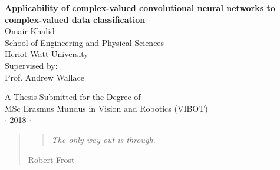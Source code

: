 
\newpage
\thispagestyle{empty}

\vspace*{2cm}
\begin{center}
{\Large\bf Applicability of complex-valued convolutional neural networks to complex-valued data classification\\} \vspace{2cm} {\large
Omair Khalid\\
\vspace{2cm}
School of Engineering and Physical Sciences \\
Heriot-Watt University\\
\vspace{2cm}
Supervised by: \\
\centering Prof. Andrew Wallace
}

\end{center}

\vspace{5cm}
\begin{center}
{\large A Thesis Submitted for the Degree of \\MSc Erasmus Mundus
in Vision and Robotics (VIBOT) \\\vspace{0.3cm} $\cdot$ 2018
$\cdot$}
\end{center}
\singlespacing


\begin{abstract}
The abstract is very abstract as of now.

\vspace*{5cm}

\end{abstract}

\begin{quote}
\vspace*{\fill}
\begin{center}
\begin{quote}
\centering \it The only way out is through.
\end{quote}
\end{center}
\hfill{\small Robert Frost}
\vspace*{\fill}

\end{quote}


